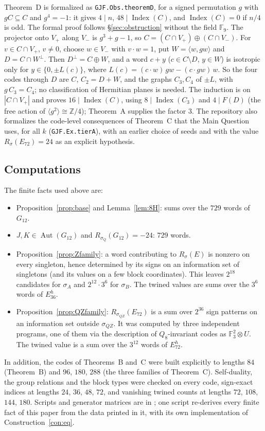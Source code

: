 \documentclass[11pt]{amsart}
\theoremstyle{definition}
\newcommand{\F}{\mathbb{F}_3}
\newcommand{\Z}{\mathbb{Z}}
\newcommand{\Index}{\operatorname{Index}}
\newcommand{\Aut}{\operatorname{Aut}}
\begin{document}
Theorem~D is formalized as \texttt{GJF.Obs.theoremD}, for a signed permutation $g$ with $gC\subseteq C$
and $g^4=-1$: it gives $4\mid n$, $48\mid\Index(C)$, and $\Index(C)=0$ if $n/4$ is odd. The formal
proof follows \S\ref{sec:obstruction} without the field $\mathbb F_9$. The projector onto $V_+$ along
$V_-$ is $g^3+g-1$, so $C=(C\cap V_+)\oplus(C\cap V_-)$. For $v\in C\cap V_+$, $v\neq0$, choose
$w\in V_-$ with $v\cdot w=1$, put $W=\langle w,gw\rangle$ and $D=C\cap W^\perp$. Then
$D^\perp=C\oplus W$, and a word $c+y$ ($c\in C\setminus D$, $y\in W$) is isotropic only for
$y\in\{0,\pm L(c)\}$, where $L(c)=(c\cdot w)\,gw-(c\cdot gw)\,w$. So the four codes through $D$ are $C$,
$C_2=D+W$, and the graphs $C_3,C_4$ of $\pm L$, with $g\,C_3=C_4$; no classification of Hermitian
planes is needed. The induction is on $|C\cap V_+|$ and proves $16\mid\Index(C)$, using
$8\mid\Index(C_3)$ and $4\mid F(D)$ (the free action of $\langle g^2\rangle\cong\Z/4$); Theorem~A
supplies the factor $3$. The repository also formalizes the code-level
consequences of Theorem~C that the Main Question uses, for all $k$ (\texttt{GJF.Ex.tierA}), with an
earlier choice of seeds and with the value $R_\sigma(E_{72})=24$ as an explicit hypothesis.

\subsection*{Computations}
The finite facts used above are:
\begin{itemize}
\item Proposition~\ref{prop:base} and Lemma~\ref{lem:8H}: sums over the $729$ words of $G_{12}$.
\item $J,K\in\Aut(G_{12})$ and $R_{\sigma_Q}(G_{12})=-24$: $729$ words.
\item Proposition~\ref{prop:Zfamily}: a word contributing to $R_\sigma(E)$ is nonzero on every
  singleton, hence determined by its signs on an information set of singletons (and its values on a
  few block coordinates). This leaves $2^{18}$ candidates for $\sigma_A$ and $2^{12}\cdot3^6$ for
  $\sigma_B$. The twined values are sums over the $3^6$ words of $E_{36}^h$.
\item Proposition~\ref{prop:QZfamily}: $R_{\sigma_{QZ}}(E_{72})$ is a sum over $2^{36}$ sign patterns
  on an information set outside $\sigma_{QZ}$. It was computed by three independent programs, one of
  them via the description of $Q_8$-invariant codes as $\F^2\otimes U$. The twined value is a sum over
  the $3^{12}$ words of $E_{72}^h$.
\end{itemize}
In addition, the codes of Theorems~B and~C were built explicitly to lengths $84$ (Theorem~B) and $96$,
$180$, $288$ (the three families of Theorem~C). Self-duality, the group relations and the block types
were checked on every code, sign-exact indices at lengths $24$, $36$, $48$, $72$, and vanishing twined
counts at lengths $72$, $108$, $144$, $180$. Scripts and generator matrices are in \cite{repo}; one
script re-derives every finite fact of this paper from the data printed in it, with its own
implementation of Construction~\ref{con:eq}.
\end{document}
